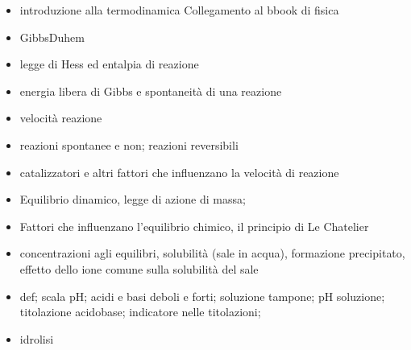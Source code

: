 \documentclass[letterpaper,10pt,english]{jupyterBook}
\begin{document}
\sphinxAtStartPar
{}
\begin{itemize}
\item {} 
\sphinxAtStartPar
introduzione alla termodinamica Collegamento al bbook di fisica

\item {} 
\sphinxAtStartPar
Gibbs\sphinxhyphen{}Duhem

\item {} 
\sphinxAtStartPar
legge di Hess ed entalpia di reazione

\item {} 
\sphinxAtStartPar
energia libera di Gibbs e spontaneità di una reazione

\end{itemize}

\sphinxAtStartPar
{}
\begin{itemize}
\item {} 
\sphinxAtStartPar
velocità reazione

\item {} 
\sphinxAtStartPar
reazioni spontanee e non; reazioni reversibili

\item {} 
\sphinxAtStartPar
catalizzatori e altri fattori che influenzano la velocità di reazione

\end{itemize}

\sphinxAtStartPar
{}
\begin{itemize}
\item {} 
\sphinxAtStartPar
Equilibrio dinamico, legge di azione di massa;

\item {} 
\sphinxAtStartPar
Fattori che influenzano l’equilibrio chimico, il principio di Le Chatelier

\item {} 
\sphinxAtStartPar
concentrazioni agli equilibri, solubilità (sale in acqua), formazione precipitato, effetto dello ione comune sulla solubilità del sale

\end{itemize}

\sphinxAtStartPar
{}
\begin{itemize}
\item {} 
\sphinxAtStartPar
def; scala pH; acidi e basi deboli e forti; soluzione tampone; pH soluzione; titolazione acido\sphinxhyphen{}base; indicatore nelle titolazioni;

\item {} 
\sphinxAtStartPar
idrolisi

\end{itemize}
\end{document}
